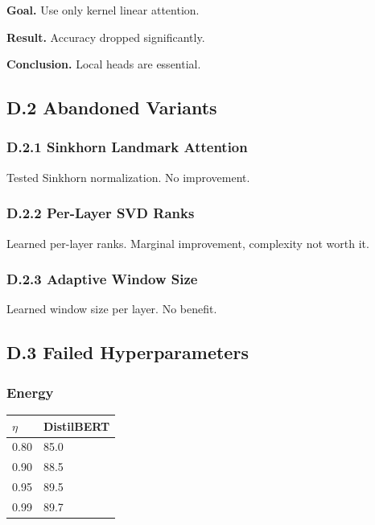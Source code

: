 \textbf{Goal.} Use only kernel linear attention.

\textbf{Result.} Accuracy dropped significantly.

\textbf{Conclusion.} Local heads are essential.

\subsection{D.2 Abandoned Variants}

\subsubsection{D.2.1 Sinkhorn Landmark Attention}

Tested Sinkhorn normalization. No improvement.

\subsubsection{D.2.2 Per-Layer SVD Ranks}

Learned per-layer ranks. Marginal improvement, complexity not worth it.

\subsubsection{D.2.3 Adaptive Window Size}

Learned window size per layer. No benefit.

\subsection{D.3 Failed Hyperparameters}

\subsubsection{Energy}

\begin{table}[H]
\centering
\small
\begin{tabular}{ll}
\toprule
\textbf{$\eta$} & \textbf{DistilBERT} \\
\midrule
0.80 & 85.0 \\
0.90 & 88.5 \\
0.95 & 89.5 \\
0.99 & 89.7 \\
\bottomrule
\end{tabular}
\end{table}

